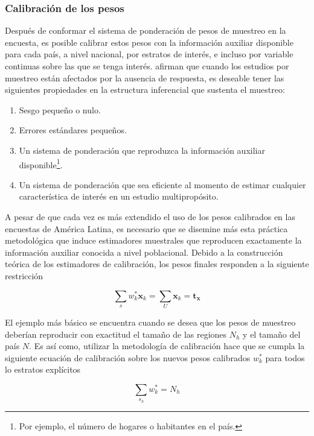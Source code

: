 \hypertarget{calibracion-de-los-pesos}{%
\subsubsection*{Calibración de los pesos}\label{calibracion-de-los-pesos}}


Después de conformar el sistema de ponderación de pesos de muestreo en la encuesta, es posible calibrar estos pesos con la información auxiliar disponible para cada país, a nivel nacional, por estratos de interés, e incluso por variable continuas sobre las que se tenga interés. \citet{Sarndal_Lundstrom_2006} afirman que cuando los estudios por muestreo están afectados por la ausencia de respuesta, es deseable tener las siguientes propiedades en la estructura inferencial que sustenta el muestreo:

\begin{enumerate}
\def\labelenumi{\arabic{enumi}.}
\tightlist
\item
  Sesgo pequeño o nulo.
\item
  Errores estándares pequeños.
\item
  Un sistema de ponderación que reproduzca la información auxiliar disponible\footnote{Por ejemplo, el número de hogares o habitantes en el país.}.
\item
  Un sistema de ponderación que sea eficiente al momento de estimar cualquier característica de interés en un estudio multipropósito.
\end{enumerate}

A pesar de que cada vez es más extendido el uso de los pesos calibrados en las encuestas de América Latina, es necesario que se disemine más esta práctica metodológica que induce estimadores muestrales que reproducen exactamente la información auxiliar conocida a nivel poblacional. Debido a la construcción teórica de los estimadores de calibración, los pesos finales responden a la siguiente restricción

\[
\sum_{s}w^*_{k}\boldsymbol{x}_k = \sum_{U}\boldsymbol{x}_{k} = \boldsymbol{t}_{\boldsymbol{x}}
\]

El ejemplo más básico se encuentra cuando se desea que los pesos de muestreo deberían reproducir con exactitud el tamaño de las regiones \(N_h\) y el tamaño del país \(N\). Es así como, utilizar la metodología de calibración \citep{Deville_Sarndal_1992} hace que se cumpla la siguiente ecuación de calibración sobre los nuevos pesos calibrados \(w_k^*\) para todos lo estratos explícitos

\[
\sum_{s_h} w_k^* = N_h
\]

